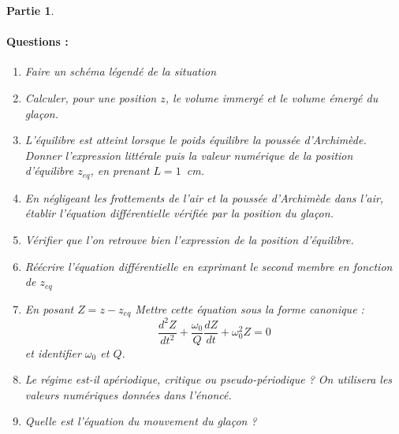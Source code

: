 \documentclass[a4paper,10pt,notitlepage,oneside]{article}
\theoremstyle{plain}
\newtheorem{partie}{\color{BlueViolet} Partie}
\begin{document}
\begin{partie}
\paragraph{\color{BlueViolet} Questions :}
\begin{enumerate}
    \item Faire un schéma légendé de la situation
    \item Calculer, pour une position $z$, le volume immergé et le volume émergé du glaçon.
    \item L'équilibre est atteint lorsque le poids équilibre la poussée d'Archimède. Donner l'expression littérale puis la valeur numérique de la position d'équilibre $z_{eq}$, en prenant $L = 1$~cm.
    \item En négligeant les frottements de l'air et la poussée d'Archimède dans l'air, établir l'équation différentielle vérifiée par la position du glaçon.
    \item Vérifier que l'on retrouve bien l'expression de la position d'équilibre.
    \item Réécrire l'équation différentielle en exprimant le second membre en fonction de $z_{eq}$
    \item En posant $Z = z-z_{eq}$ Mettre cette équation sous la forme canonique :
    \begin{equation*}
        \dfrac{d^2Z}{dt^2}+\dfrac{\omega_0}{Q}\dfrac{dZ}{dt}+\omega_0^2 Z = 0
    \end{equation*}
    et identifier $\omega_0$ et $Q$.
    \item Le régime est-il apériodique, critique ou pseudo-périodique ? On utilisera les valeurs numériques données dans l'énoncé.
     \item Quelle est l'équation du mouvement du glaçon ?
\end{enumerate}




\end{partie}
\end{document}

